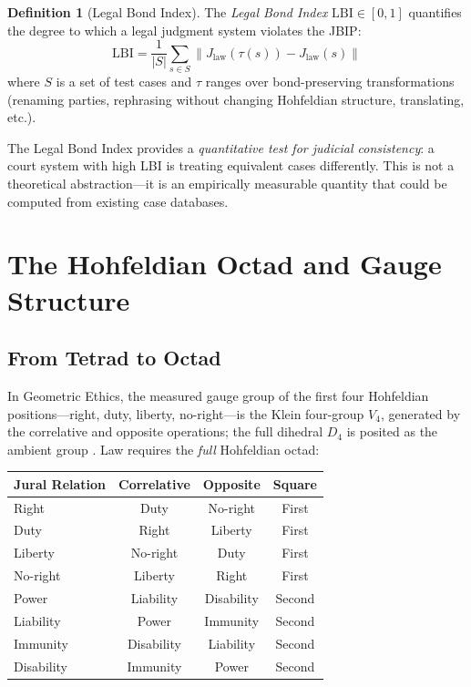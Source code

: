 \documentclass[12pt]{article}
\theoremstyle{definition}
\newtheorem{definition}[theorem]{Definition}
\theoremstyle{remark}
\newcommand{\LBI}{\mathrm{LBI}}            %
\begin{document}
\begin{definition}[Legal Bond Index]
\label{def:lbi}
The \emph{Legal Bond Index} $\LBI \in [0, 1]$ quantifies the degree to which a legal judgment system violates the JBIP:
\begin{equation}
\LBI = \frac{1}{|S|} \sum_{s \in S} \| J_{\text{law}}(\tau(s)) - J_{\text{law}}(s) \|
\label{eq:lbi}
\end{equation}
where $S$ is a set of test cases and $\tau$ ranges over bond-preserving transformations (renaming parties, rephrasing without changing Hohfeldian structure, translating, etc.).
\end{definition}

The Legal Bond Index provides a \emph{quantitative test for judicial consistency}: a court system with high LBI is treating equivalent cases differently.  This is not a theoretical abstraction---it is an empirically measurable quantity that could be computed from existing case databases.


\section{The Hohfeldian Octad and Gauge Structure}
\label{sec:gauge}

\subsection{From Tetrad to Octad}

In Geometric Ethics, the measured gauge group of the first four Hohfeldian positions---right, duty, liberty, no-right---is the Klein four-group $V_4$, generated by the correlative and opposite operations; the full dihedral $D_4$ is posited as the ambient group \cite{anon2026a}.  Law requires the \emph{full} Hohfeldian octad:

\begin{center}
\begin{tabular}{lccc}
\toprule
\textbf{Jural Relation} & \textbf{Correlative} & \textbf{Opposite} & \textbf{Square} \\
\midrule
Right & Duty & No-right & First \\
Duty & Right & Liberty & First \\
Liberty & No-right & Duty & First \\
No-right & Liberty & Right & First \\
\midrule
Power & Liability & Disability & Second \\
Liability & Power & Immunity & Second \\
Immunity & Disability & Liability & Second \\
Disability & Immunity & Power & Second \\
\bottomrule
\end{tabular}
\end{center}
\end{document}
